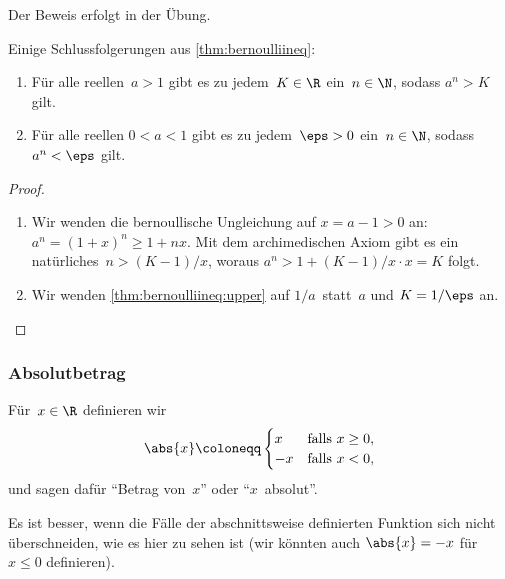 \documentclass[a4paper]{article}
\begin{document}
Der Beweis erfolgt in der Übung.

Einige Schlussfolgerungen aus \cref{thm:bernoulliineq}:

\begin{theorem}\label{thm:archimedesbernoulli}\leavevmode
    \begin{enumerate}
        \item Für alle reellen~$a > 1$ gibt es zu jedem~$K \in \R$ ein~$n \in \N$, sodass $a^n > K$ gilt.\label{thm:bernoulliineq:upper}
        \item Für alle reellen $0 < a < 1$ gibt es zu jedem~$\eps > 0$ ein~$n \in \N$, sodass $a^n < \eps$ gilt.
    \end{enumerate}
\end{theorem}

\begin{proof}\leavevmode
    \begin{enumerate}
        \item Wir wenden die bernoullische Ungleichung auf $x = a - 1 > 0$ an: $a^n = (1 + x)^n \geq 1 + nx$. Mit dem archimedischen Axiom gibt es ein natürliches~$n > (K-1)/x$, woraus $a^n > 1 + (K-1)/x \cdot x = K$ folgt.
        \item Wir wenden \cref{thm:bernoulliineq:upper} auf $1/a$~statt~$a$ und $K = 1/\eps$ an.\qedhere
    \end{enumerate}
\end{proof}

\subsubsection{Absolutbetrag}

\begin{definition}[Absolutbetrag]
    Für~$x \in \R$ definieren wir
    \begin{equation*}
        \abs{x} \coloneqq \begin{cases}
            x  & \text{falls } x \geq 0, \\
            -x & \text{falls } x < 0,
        \end{cases}
    \end{equation*}
    und sagen dafür "`Betrag von~$x$"' oder "`$x$~absolut"'.
\end{definition}

Es ist besser, wenn die Fälle der abschnittsweise definierten Funktion sich nicht überschneiden, wie es hier zu sehen ist (wir könnten auch $\abs{x} = -x$ für~$x \leq 0$ definieren).
\end{document}
